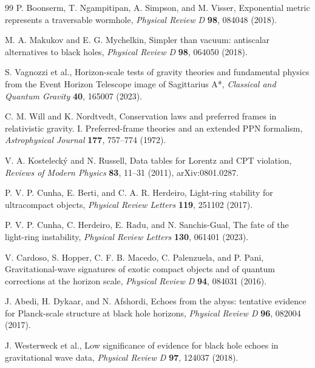 \documentclass[12pt,a4paper]{article}
\begin{document}
\begin{thebibliography}{99}
P. Boonserm, T. Ngampitipan, A. Simpson, and M. Visser, Exponential metric
represents a traversable wormhole, \textit{Physical Review D} \textbf{98},
084048 (2018).

M. A. Makukov and E. G. Mychelkin, Simpler than vacuum: antiscalar
alternatives to black holes, \textit{Physical Review D} \textbf{98},
064050 (2018).

S. Vagnozzi et al., Horizon-scale tests of gravity theories and fundamental
physics from the Event Horizon Telescope image of Sagittarius A*,
\textit{Classical and Quantum Gravity} \textbf{40}, 165007 (2023).

C. M. Will and K. Nordtvedt, Conservation laws and preferred frames in
relativistic gravity. I. Preferred-frame theories and an extended PPN
formalism, \textit{Astrophysical Journal} \textbf{177}, 757--774 (1972).

V. A. Kosteleck\'y and N. Russell, Data tables for Lorentz and CPT
violation, \textit{Reviews of Modern Physics} \textbf{83}, 11--31 (2011),
arXiv:0801.0287.

P. V. P. Cunha, E. Berti, and C. A. R. Herdeiro, Light-ring stability for
ultracompact objects, \textit{Physical Review Letters} \textbf{119},
251102 (2017).

P. V. P. Cunha, C. Herdeiro, E. Radu, and N. Sanchis-Gual, The fate of the
light-ring instability, \textit{Physical Review Letters} \textbf{130},
061401 (2023).

V. Cardoso, S. Hopper, C. F. B. Macedo, C. Palenzuela, and P. Pani,
Gravitational-wave signatures of exotic compact objects and of quantum
corrections at the horizon scale, \textit{Physical Review D} \textbf{94},
084031 (2016).

J. Abedi, H. Dykaar, and N. Afshordi, Echoes from the abyss: tentative
evidence for Planck-scale structure at black hole horizons,
\textit{Physical Review D} \textbf{96}, 082004 (2017).

J. Westerweck et al., Low significance of evidence for black hole echoes
in gravitational wave data, \textit{Physical Review D} \textbf{97},
124037 (2018).

\end{thebibliography}
\end{document}
